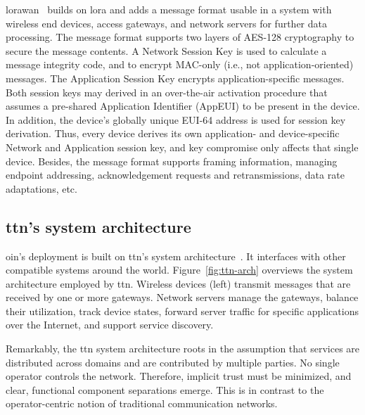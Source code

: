 \gls{lorawan}~\cite{lorawan-specs} builds on \gls{lora} and adds
a message format usable in a system with wireless end devices,
access gateways, and network servers for further data processing.
The message format
supports two layers of AES-128 cryptography to secure
the message contents. A Network Session Key is used to calculate a
message integrity code, and to encrypt MAC-only (i.e., not
application-oriented) messages. The Application Session Key encrypts
application-specific messages. Both session keys may derived in an
over-the-air activation procedure that assumes a pre-shared
Application Identifier (AppEUI) to be present in the device.
In addition, the device's globally unique EUI-64 address is used
for session key derivation. Thus, every device derives its own
application- and device-specific Network and Application session key,
and key compromise only affects that single device.
Besides, the message format supports framing information, managing
endpoint addressing, acknowledgement requests and retransmissions,
data rate adaptations, etc.


\subsection{\gls{ttn}'s system architecture}

\gls{oin}'s deployment is built on \gls{ttn}'s system architecture~\cite{ttn}.
It interfaces with other compatible systems around the world.
Figure~\ref{fig:ttn-arch} overviews the system architecture employed
by \gls{ttn}. Wireless devices (left) transmit messages that are
received by one or more gateways. Network servers manage the gateways,
balance their utilization, track device states, forward server traffic
for specific applications over the Internet, and support service discovery.

Remarkably, the \gls{ttn} system architecture roots in the assumption
that services are distributed across domains and are contributed
by multiple parties. No single operator controls the network.
Therefore, implicit trust must be minimized, and clear, functional
component separations emerge.
This is in contrast to the operator-centric notion of traditional
communication networks.

